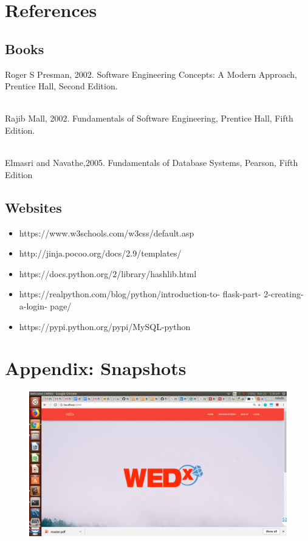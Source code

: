 \documentclass[12pt]{report}
\begin{document}
\chapter{References} 

\section{Books}
\noindent [1] Roger S Presman, 2002. Software Engineering Concepts: A Modern Approach, Prentice Hall, Second Edition. \\\

\noindent [2] Rajib Mall, 2002. Fundamentals of Software Engineering, Prentice Hall, Fifth Edition. \\\

\noindent [3] Elmasri and Navathe,2005. Fundamentals of Database Systems, Pearson, Fifth Edition


\section{Websites}

\begin{itemize}
\item https://www.w3schools.com/w3css/default.asp
\item http://jinja.pocoo.org/docs/2.9/templates/
\item https://docs.python.org/2/library/hashlib.html
\item https://realpython.com/blog/python/introduction-to- flask-part- 2-creating- a-login-
page/
\item https://pypi.python.org/pypi/MySQL-python
\end{itemize}

\chapter{Appendix: Snapshots} 

\begin{figure}[!htb]
    \centering
    \includegraphics[width=1\textwidth]{sc-1.png}
\end{figure}
\end{document}
